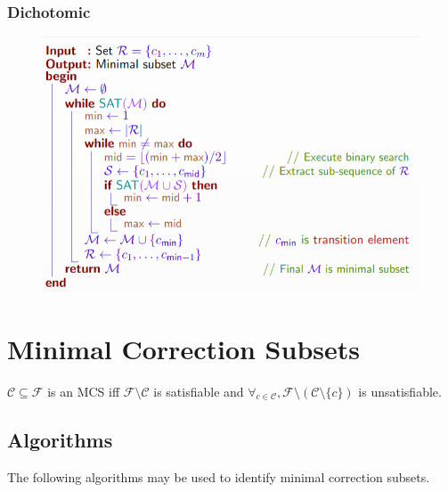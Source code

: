 \documentclass[10pt,a4paper]{report}
\begin{document}
\subsubsection{Dichotomic}
\begin{figure}[H]
    \centering
    \includegraphics[scale=0.5]{14.png}
\end{figure}

\section{Minimal Correction Subsets}
$\mathcal{C} \subseteq \mathcal{F}$ is an MCS iff $\mathcal{F} \setminus \mathcal{C}$ is satisfiable and $\forall_{c \in \mathcal{C}}, \mathcal{F} \setminus (\mathcal{C} \setminus \{c\})$ is unsatisfiable.
\subsection{Algorithms}
The following algorithms may be used to identify minimal correction subsets.
\end{document}

